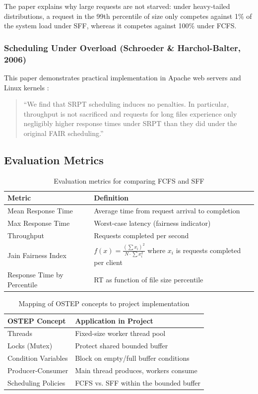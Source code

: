 \documentclass[11pt,a4paper]{article}
\begin{document}
The paper explains why large requests are not starved: under heavy-tailed distributions, a request in the 99th percentile of size only competes against 1\% of the system load under SFF, whereas it competes against 100\% under FCFS.

\subsubsection{Scheduling Under Overload (Schroeder \& Harchol-Balter, 2006)}

This paper demonstrates practical implementation in Apache web servers and Linux kernels \cite{schroeder2006}:

\begin{quote}
``We find that SRPT scheduling induces no penalties. In particular, throughput is not sacrificed and requests for long files experience only negligibly higher response times under SRPT than they did under the original FAIR scheduling.''
\end{quote}

\subsection{Evaluation Metrics}

\begin{table}[h!]
\centering
\begin{tabular}{@{}lp{7cm}@{}}
\toprule
\textbf{Metric} & \textbf{Definition} \\
\midrule
Mean Response Time & Average time from request arrival to completion \\
Max Response Time & Worst-case latency (fairness indicator) \\
Throughput & Requests completed per second \\
Jain Fairness Index & $f(x) = \frac{(\sum x_i)^2}{N \cdot \sum x_i^2}$ where $x_i$ is requests completed per client \\
Response Time by Percentile & RT as function of file size percentile \\
\bottomrule
\end{tabular}
\caption{Evaluation metrics for comparing FCFS and SFF}
\end{table}


\begin{table}[h!]
\centering
\begin{tabular}{@{}ll@{}}
\toprule
\textbf{OSTEP Concept} & \textbf{Application in Project} \\
\midrule
Threads & Fixed-size worker thread pool \\
Locks (Mutex) & Protect shared bounded buffer \\
Condition Variables & Block on empty/full buffer conditions \\
Producer-Consumer & Main thread produces, workers consume \\
Scheduling Policies & FCFS vs. SFF within the bounded buffer \\
\bottomrule
\end{tabular}
\caption{Mapping of OSTEP concepts to project implementation}
\end{table}
\end{document}
